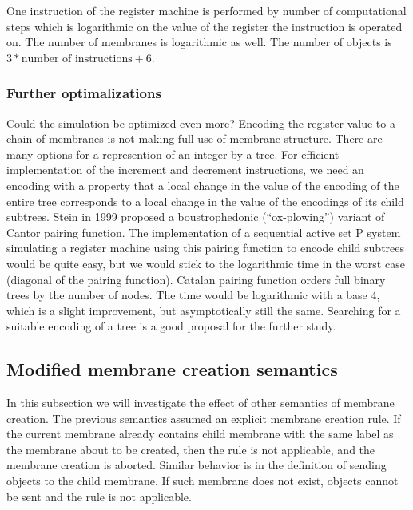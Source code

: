     One instruction of the register machine is performed by number of computational steps which is logarithmic on the value of the register the instruction is operated on. The number of membranes is logarithmic as well. The number of objects is $3 * \text{number of instructions} + 6$.

  \subsubsection{Further optimalizations} %
  \label{ssub:further_optimalizations}
    Could the simulation be optimized even more? Encoding the register value to a chain of membranes is not making full use of membrane structure. There are many options for a represention of an integer by a tree. For efficient implementation of the increment and decrement instructions, we need an encoding with a property that a local change in the value of the encoding of the entire tree corresponds to a local change in the value of the encodings of its child subtrees. Stein in 1999 \cite{Stein99Plowing} proposed a boustrophedonic (``ox-plowing'') variant of Cantor pairing function. The implementation of a sequential active set P system simulating a register machine using this pairing function to encode child subtrees would be quite easy, but we would stick to the logarithmic time in the worst case (diagonal of the pairing function).
    Catalan pairing function \cite{Stanley1986EnumerativeCombinatorics} orders full binary trees by the number of nodes. The time would be logarithmic with a base 4, which is a slight improvement, but asymptotically still the same.
    Searching for a suitable encoding of a tree is a good proposal for the further study.


\subsection{Modified membrane creation semantics} %
\label{sub:modified_membrane_creation_semantics}
  
  In this subsection we will investigate the effect of other semantics of membrane creation. The previous semantics assumed an explicit membrane creation rule. If the current membrane already contains child membrane with the same label as the membrane about to be created, then the rule is not applicable, and the membrane creation is aborted. Similar behavior is in the definition of sending objects to the child membrane. If such membrane does not exist, objects cannot be sent and the rule is not applicable.

